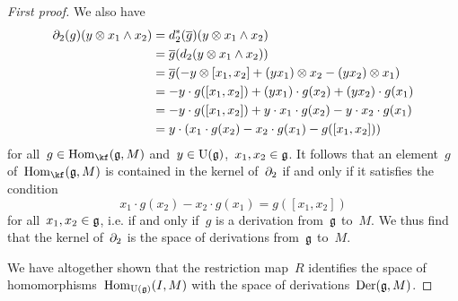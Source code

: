 \begin{proof}[First proof]
	We also have
	\begin{align*}
		\partial_2(g)(y \otimes x_1 \wedge x_2)
		&=
		d_2^*(\overline{g})(y \otimes x_1 \wedge x_2)
		\\
		&=
		\overline{g}( d_2( y \otimes x_1 \wedge x_2 ) )
		\\
		&=
		\overline{g}
		(
			- y \otimes [x_1, x_2]
			+ (y x_1) \otimes x_2
			- (y x_2) \otimes x_1
		)
		\\
		&=
		- y \cdot g([x_1, x_2])
		+ (y x_1) \cdot g(x_2)
		+ (y x_2) \cdot g(x_1)
		\\
		&=
		- y \cdot g([x_1, x_2])
		+ y \cdot x_1 \cdot g(x_2)
		- y \cdot x_2 \cdot g(x_1)
		\\
		&=
		y \cdot
		(
			x_1 \cdot g(x_2) - x_2 \cdot g(x_1) - g([x_1, x_2])
		) 
	\end{align*}
	for all~$g \in \Hom_{\kf}(\glie, M)$ and~$y \in \operatorname{U}(\mathfrak{g})$,~$x_1, x_2 \in \mathfrak{g}$.
	It follows that an element~$g$ of~$\Hom_{\kf}(\glie, M)$ is contained in the kernel of~$\partial_2$ if and only if it satisfies the condition
	\[
		x_1 \cdot g(x_2) - x_2 \cdot g(x_1)
		=
		g([x_1, x_2])
	\]
	for all~$x_1, x_2 \in \mathfrak{g}$, i.e. if and only if~$g$ is a derivation from~$\mathfrak{g}$ to~$M$.
	We thus find that the kernel of~$\partial_2$ is the space of derivations from~$\mathfrak{g}$ to~$M$.

	We have altogether shown that the restriction map~$R$ identifies the space of homomorphisms~$\operatorname{Hom}_{\operatorname{U}(\mathfrak{g})}(I, M)$ with the space of derivations~$\operatorname{Der}(\mathfrak{g}, M)$.
\end{proof}


